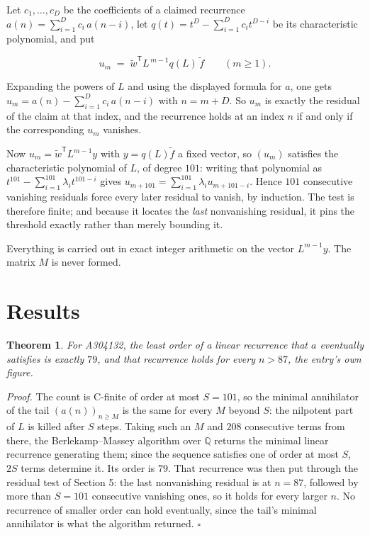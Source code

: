 \documentclass[11pt]{article}
\newtheorem{theorem}{Theorem}
\theoremstyle{definition}
\begin{document}
Let $c_1,\dots,c_D$ be the coefficients of a claimed recurrence $a(n) = \sum_{i=1}^{D} c_i\,a(n-i)$, let $q(t) = t^{D} - \sum_{i=1}^{D} c_i t^{D-i}$ be its characteristic polynomial, and put

\[u_m \;=\; \tilde w^{\mathsf T} L^{\,m-1} q(L)\,\tilde f \qquad (m \ge 1).\]

Expanding the powers of $L$ and using the displayed formula for $a$, one gets $u_m = a(n) - \sum_{i=1}^{D} c_i\,a(n-i)$ with $n = m + D$. So $u_m$ is exactly the residual of the claim at that index, and the recurrence holds at an index $n$ if and only if the corresponding $u_m$ vanishes.

Now $u_m = \tilde w^{\mathsf T} L^{m-1} y$ with $y = q(L)\tilde f$ a fixed vector, so $(u_m)$ satisfies the characteristic polynomial of $L$, of degree $101$: writing that polynomial as $t^{101} - \sum_{i=1}^{101} \lambda_i t^{101-i}$ gives $u_{m+101} = \sum_{i=1}^{101} \lambda_i u_{m+101-i}$. Hence $101$ consecutive vanishing residuals force every later residual to vanish, by induction. The test is therefore finite; and because it locates the {\itshape last} nonvanishing residual, it pins the threshold exactly rather than merely bounding it.

Everything is carried out in exact integer arithmetic on the vector $L^{m-1}y$. The matrix $M$ is never formed.

\section{Results}

\begin{theorem} For A304132, the least order of a linear recurrence that $a$ eventually satisfies is exactly $79$, and that recurrence holds for every $n > 87$, the entry's own figure.\end{theorem}

{\itshape Proof.} The count is C-finite of order at most $S = 101$, so the minimal annihilator of the tail $(a(n))_{n \ge M}$ is the same for every $M$ beyond $S$: the nilpotent part of $L$ is killed after $S$ steps. Taking such an $M$ and $208$ consecutive terms from there, the Berlekamp--Massey algorithm over $\mathbb{Q}$ returns the minimal linear recurrence generating them; since the sequence satisfies one of order at most $S$, $2S$ terms determine it. Its order is $79$. That recurrence was then put through the residual test of Section 5: the last nonvanishing residual is at $n = 87$, followed by more than $S = 101$ consecutive vanishing ones, so it holds for every larger $n$. No recurrence of smaller order can hold eventually, since the tail's minimal annihilator is what the algorithm returned. $\square$
\end{document}
